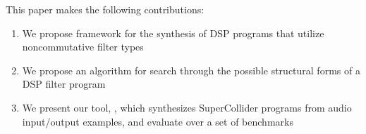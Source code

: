 This paper makes the following contributions:

\begin{enumerate}
\item We propose framework for the synthesis of DSP programs that utilize noncommutative filter types 
\item We propose an algorithm for search through the possible structural forms of a DSP filter program
\item We present our tool, \ourTool, which synthesizes SuperCollider programs from audio input/output examples, and evaluate \ourTool over a set of benchmarks
\end{enumerate}



